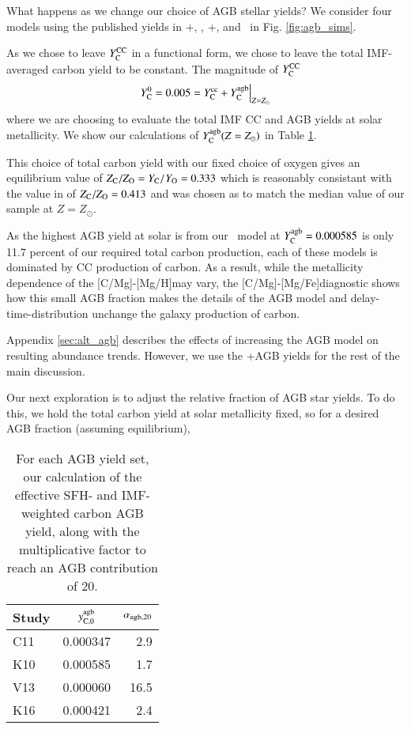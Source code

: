 \documentclass[12pt,oneside]{book}
\newcommand{\cristallo}{\citetalias{cristallo+11}+\citetalias{cristallo+15}}
\newcommand{\karakas}{\citetalias{karakas10}}
\newcommand{\kl}{\citetalias{KL16}+\citetalias{karakas+18}}
\newcommand{\ventura}{\citetalias{ventura+13}}
\newcommand{\caah}{[C/Mg]-[Mg/H]}
\newcommand{\caafe}{[C/Mg]-[Mg/Fe]}
\newcommand{\sun}{\ensuremath{\odot}}
\begin{document}
What happens as we change our choice of AGB stellar yields? We consider four models
using the published yields in \cristallo, \karakas, \kl, and \ventura~in Fig.
\ref{fig:agb_sims}. 

As we chose to leave $Y_{\rm C}^{\rm CC}$ in a functional form, we chose to
leave the total IMF-averaged carbon yield to be constant. The magnitude of
$Y_{\rm C}^{\rm CC}$
\begin{equation}
    Y_{\rm C}^{0}  = 0.005  =  Y_{\rm C}^{\rm cc} + Y_{\rm C}^{\rm agb}
\Big \rvert_{Z=Z_\odot}
\end{equation}
where we are choosing to evaluate the total IMF CC and AGB yields at solar
metallicity. We show our calculations of $Y_{\rm C}^{\rm agb}(Z=Z_{\sun })$  in
Table \ref{tab:alpha_agb}. 

This choice of total carbon yield with our fixed choice of oxygen gives an
equilibrium value of $Z_{\rm C}/Z_{\rm O} = Y_{\rm C}/Y_{\rm O} = 0.333$ which
is reasonably consistant with the value in \citet{asplund+09} of $Z_{\rm
C}/Z_{\rm O}=0.413$ and was chosen as to match the median value of our sample
at $Z=Z_{\sun }$. 

As the highest AGB yield at solar is from our \karakas~model at $Y_{\rm C}^{\rm
agb} = 0.000585$ is only 11.7 percent of our required total carbon production,
each of these models is dominated by CC production of carbon. As a result,
while the metallicity dependence of the \caah may vary, the
\caafe diagnostic shows how this small AGB fraction makes the details of
the AGB model and delay-time-distribution unchange the galaxy production of
carbon. 

Appendix \ref{sec:alt_agb} describes the effects of increasing the AGB model on
resulting abundance trends. However, we use the \cristallo AGB yields for the
rest of the main discussion.

Our next exploration is to adjust the relative fraction of AGB star yields. To do this, we hold the total carbon yield at solar metallicity fixed, so for a desired AGB fraction (assuming equilibrium), 


\begin{table}
	\centering
	\caption{For each AGB yield set, our calculation of the effective SFH- and IMF-weighted carbon AGB yield, along with the multiplicative factor to reach an AGB contribution of 20.}
	\label{tab:alpha_agb}
	\begin{tabular}{lcr} %
		\hline
		Study & $y_{\rm C, 0}^{\rm agb}$ & $\alpha_{\rm agb, 20}$\\
		\hline
		C11 & 0.000347 & 2.9\\
		K10 & 0.000585 & 1.7\\
		V13 & 0.000060 & 16.5\\
		K16 & 0.000421 & 2.4\\
		\hline
	\end{tabular}
\end{table}
\end{document}
